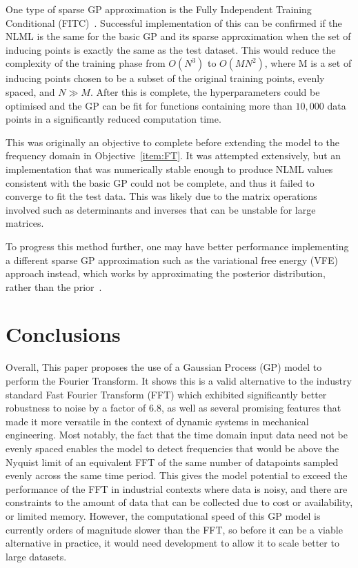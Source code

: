\documentclass[12pt]{article}
\begin{document}
    One type of sparse GP approximation is the Fully Independent Training Conditional (FITC)~\cite{q-candela}.
    Successful implementation of this can be confirmed if the NLML is the same for the basic GP and its sparse approximation when the set of inducing points is exactly the same as the test dataset.
    This would reduce the complexity of the training phase from $O(N^3)$ to $O(MN^2)$, where M is a set of inducing points chosen to be a subset of the original training points, evenly spaced, and $N \gg M$. 
    After this is complete, the hyperparameters could be optimised and the GP can be fit for functions containing more than $10,000$ data points in a significantly reduced computation time.

     This was originally an objective to complete before extending the model to the frequency domain in Objective~\ref{item:FT}.
    It was attempted extensively, but an implementation that was numerically stable enough to produce NLML values consistent with the basic GP could not be complete, and thus it failed to converge to fit the test data.
    This was likely due to the matrix operations involved such as determinants and inverses that can be unstable for large matrices.

    To progress this method further, one may have better performance implementing a different sparse GP approximation such as the variational free energy (VFE) approach instead, which works by approximating the posterior distribution, rather than the prior~\cite{murphy2023probabilistic}.


    \section{Conclusions}
    Overall, This paper proposes the use of a Gaussian Process (GP) model to perform the Fourier Transform.
    It shows this is a valid alternative to the industry standard Fast Fourier Transform (FFT) which exhibited significantly better robustness to noise by a factor of 6.8, as well as several promising features that made it more versatile in the context of dynamic systems in mechanical engineering.
    Most notably, the fact that the time domain input data need not be evenly spaced enables the model to detect frequencies that would be above the Nyquist limit of an equivalent FFT of the same number of datapoints sampled evenly across the same time period.
    This gives the model potential to exceed the performance of the FFT in industrial contexts where data is noisy, and there are constraints to the amount of data that can be collected due to cost or availability, or limited memory.
    However, the computational speed of this GP model is currently orders of magnitude slower than the FFT, so before it can be a viable alternative in practice, it would need development to allow it to scale better to large datasets.

    \FloatBarrier

    \newpage
    \printbibliography
    \newpage
    
\end{document}
